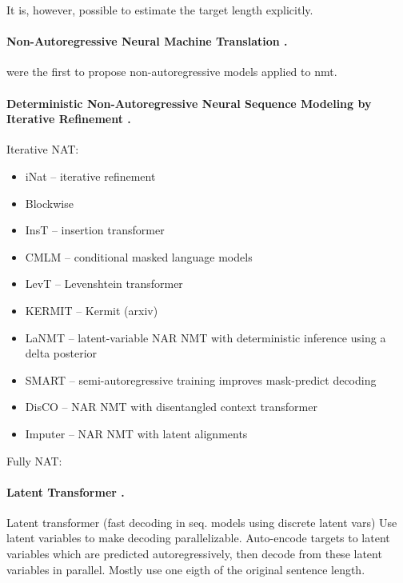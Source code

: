 It is, however, possible to estimate the target length explicitly. 




\paragraph{Non-Autoregressive Neural Machine Translation \citep{gu2017nonautoregressive}.}

\citet{gu2017nonautoregressive} were the first to propose non-autoregressive
models applied to \gls{nmt}.

\paragraph{Deterministic Non-Autoregressive Neural Sequence Modeling by Iterative Refinement \citep{lee2018deterministic}.}


\citep{ghazvininejad2019mask} \citep{mansimov2019generalized}


Iterative NAT:
\begin{itemize}
\item iNat \citep{lee2018deterministic} -- iterative refinement
\item Blockwise \citep{stern2018blockwise}
\item InsT \citep{stern2019insertion} -- insertion transformer
\item CMLM \citep{ghazvininejad2019mask} -- conditional masked language models
\item LevT \citep{gu2019levenshtein} -- Levenshtein transformer
\item KERMIT \citep{chan2019kermit} -- Kermit (arxiv)
\item LaNMT \citep{shu2020latent} -- latent-variable NAR NMT with deterministic inference using a delta posterior
\item SMART \citep{ghazvininejad2020semiautoregressive} -- semi-autoregressive training improves mask-predict decoding
\item DisCO \citep{kasai2020nonautoregressive} -- NAR NMT with disentangled context transformer
\item Imputer \citep{saharia2020nonautoregressive} -- NAR NMT with latent alignments
\end{itemize}

Fully NAT:

\paragraph{Latent Transformer \citep{kaiser2018fast}.} Latent transformer (fast
decoding in seq. models using discrete latent vars) Use latent variables to make
decoding parallelizable. Auto-encode targets to latent variables which are
predicted autoregressively, then decode from these latent variables in
parallel. Mostly use one eigth of the original sentence length.

